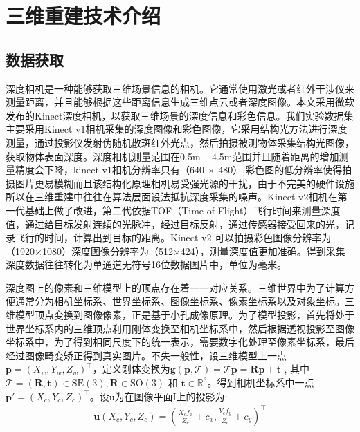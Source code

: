 \chapter{三维重建技术介绍}
\section{数据获取}

深度相机是一种能够获取三维场景信息的相机。它通常使用激光或者红外干涉仪来测量距离，并且能够根据这些距离信息生成三维点云或者深度图像。本文采用微软发布的Kinect深度相机，以获取三维场景的深度信息和彩色信息。我们实验数据集主要采用Kinect v1相机采集的深度图像和彩色图像，它采用结构光方法进行深度测量，通过投影仪发射伪随机散斑红外光点，然后拍摄被测物体采集结构光图像，获取物体表面深度。深度相机测量范围在0.5m ~ 4.5m范围并且随着距离的增加测量精度会下降，kinect v1相机分辨率只有（640 $\times$ 480）,彩色图的低分辨率使得拍摄图片更易模糊而且该结构化原理相机易受强光源的干扰，由于不完美的硬件设施所以在三维重建中往往在算法层面设法抵抗深度采集的噪声。Kinect v2相机在第一代基础上做了改进，第二代依据TOF（Time of Flight）飞行时间来测量深度值，通过给目标发射连续的光脉冲，经过目标反射，通过传感器接受回来的光，记录飞行的时间，计算出到目标的距离。Kinect v2 可以拍摄彩色图像分辨率为（1920$\times$1080）深度图像分辨率为（512$\times$424），测量深度值更加准确。得到采集深度数据往往转化为单通道无符号16位数据图片中，单位为毫米。\par 
深度图上的像素和三维模型上的顶点存在着一一对应关系。三维世界中为了计算方便通常分为相机坐标系、世界坐标系、图像坐标系、像素坐标系以及对象坐标。三维模型顶点变换到图像像素，正是基于小孔成像原理。为了模型投影，首先将处于世界坐标系内的三维顶点利用刚体变换至相机坐标系中，然后根据透视投影至图像坐标系中，为了得到相同尺度下的统一表示，需要数字化处理至像素坐标系，最后经过图像畸变矫正得到真实图片。不失一般性，设三维模型上一点$\boldsymbol{p} = (X_w,Y_w,Z_w)^\top $，定义刚体变换为$\mathbf{g}\left(\boldsymbol{p}, \mathcal{T}\right)=\mathcal{T} \boldsymbol{p} = \boldsymbol{R} \boldsymbol{p}+\boldsymbol{t}$ ,
其中$\mathcal{T}=\left(\boldsymbol{R}, \boldsymbol{t}\right) \in \mathrm{SE} (3), \boldsymbol{R}   \in \mathrm{SO}(3) \text { 和 } \boldsymbol{t} \in \mathbb{R}^{3}$。得到相机坐标系中一点$\boldsymbol{p'}=(X_c,Y_c,Z_c)^\top$。设$\mathrm{u}$为在图像平面$\mathrm{I}$上的投影为:
\begin{align}
 \mathbf{u}\left(X_c, Y_c, Z_c\right)=\left(\frac{X_{c} f_{x}}{Z_{c}}+c_{x}, \frac{Y_{c} f_{y}}{Z_{c}}+c_{y}\right)^{\top}
\end{align}
